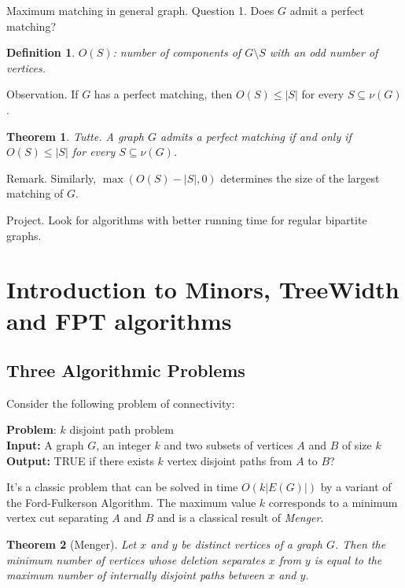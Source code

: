 \documentclass[12pt,a4paper]{article}
\newtheorem{theorem}{Theorem}
\newtheorem{definition}{Definition}
\begin{document}
Maximum matching in general graph.  Question 1.  Does \(G\) admit a perfect
matching?

\begin{definition}
  \(O(S)\): number of components of \(G \setminus S\) with an odd number of
  vertices.
\end{definition}

Observation.  If \(G\) has a perfect matching, then \(O(S) \leq |S|\) for every
\(S \subseteq \nu(G)\).

\begin{theorem}
  Tutte.  A graph \(G\) admits a perfect matching if and only if
  \(O(S) \leq |S|\) for every \(S \subseteq \nu(G)\).
\end{theorem}

Remark.  Similarly, \(\max(O(S) - |S|, 0)\) determines the size of the largest
matching of \(G\).

Project.  Look for algorithms with better running time for regular bipartite
graphs.

\section{Introduction to Minors, TreeWidth and FPT algorithms}
\subsection{Three Algorithmic Problems}
Consider the following problem of connectivity:

\vspace{0.2cm}
\noindent \textbf{Problem}: $k$ disjoint path problem\\
\textbf{Input:} A graph $G$, an integer $k$ and two subsets of vertices $A$ and
$B$ of size $k$\\
\textbf{Output:} TRUE if there exists $k$ vertex disjoint paths from $A$ to $B$?\\
\vspace{0.2cm}

\noindent It's a classic problem that can be solved in time $O(k|E(G)|)$ by a
variant of the Ford-Fulkerson Algorithm.  The maximum value $k$ corresponds to a
minimum vertex cut separating $A$ and $B$ and is a classical result of
\textit{Menger}.

\begin{theorem}[Menger]
  Let $x$ and $y$ be distinct vertices of a graph $G$.  Then the minimum number
  of vertices whose deletion separates $x$ from $y$ is equal to the maximum
  number of internally disjoint paths between $x$ and $y$.
\end{theorem}
\end{document}
